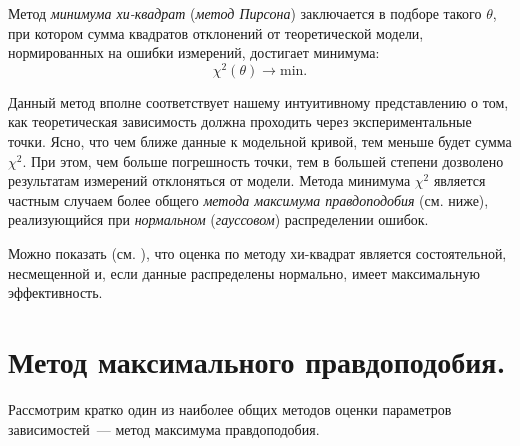 Метод \emph{минимума хи-квадрат} (\emph{метод Пирсона}) заключается в подборе такого
$\theta$, при котором сумма квадратов отклонений от теоретической
модели, нормированных на ошибки измерений, достигает минимума:
\[
\chi^2(\theta) \to \mathrm{min}.
\]


Данный метод вполне соответствует нашему интуитивному представлению
о том, как теоретическая зависимость должна проходить через экспериментальные
точки. Ясно, что чем ближе данные к модельной кривой, тем
меньше будет сумма $\chi^2$. При этом, чем больше погрешность точки, тем
в большей степени дозволено результатам измерений отклоняться от модели.
Метода минимума $\chi^2$ является частным случаем
более общего \emph{метода максимума правдоподобия} (см. ниже),
реализующийся при \emph{нормальном} (\emph{гауссовом}) распределении ошибок.

Можно показать (см. \cite{idie}), что оценка по методу хи-квадрат является состоятельной,
несмещенной и, если данные распределены нормально,
имеет максимальную эффективность.




\section{Метод максимального правдоподобия.} 
Рассмотрим кратко один
из наиболее общих методов оценки параметров зависимостей~---
метод максимума правдоподобия.

